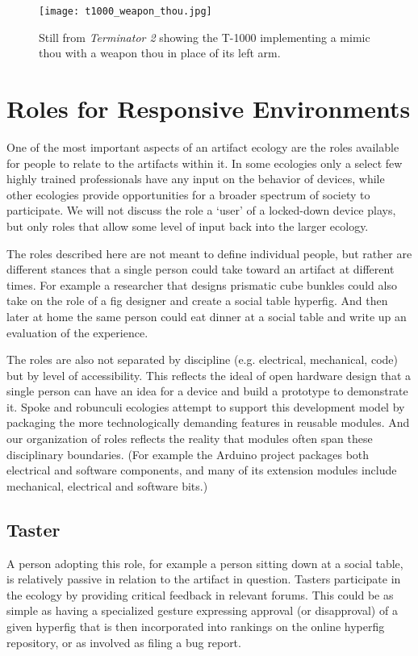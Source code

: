 \begin{figure}[]
  \centering
    \texttt{[image: t1000\_weapon\_thou.jpg]}
  \caption{Still from \emph{Terminator 2} showing the T-1000 implementing a mimic thou with a weapon thou in place of its left arm.}
  \label{fig:t1000_weapon_thou}
\end{figure}



\section{Roles for Responsive Environments}
\label{sec:roles}
%
One of the most important aspects of an artifact ecology are the roles available for people to relate to the artifacts within it. In some ecologies only a select few highly trained professionals have any input on the behavior of devices, while other ecologies provide opportunities for a broader spectrum of society to participate. We will not discuss the role a `user' of a locked-down device plays, but only roles that allow some level of input back into the larger ecology.

The roles described here are not meant to define individual people, but rather are different stances that a single person could take toward an artifact at different times. For example a researcher that designs prismatic cube bunkles could also take on the role of a fig designer and create a social table hyperfig. And then later at home the same person could eat dinner at a social table and write up an evaluation of the experience.

The roles are also not separated by discipline (e.g. electrical, mechanical, code) but by level of accessibility. This reflects the ideal of open hardware design that a single person can have an idea for a device and build a prototype to demonstrate it. Spoke and robunculi ecologies attempt to support this development model by packaging the more technologically demanding features in reusable modules. And our organization of roles reflects the reality that modules often span these disciplinary boundaries. (For example the Arduino project packages both electrical and software components, and many of its extension modules include mechanical, electrical and software bits.)

\subsection{Taster}
A person adopting this role, for example a person sitting down at a social table, is relatively passive in relation to the artifact in question. Tasters participate in the ecology by providing critical feedback in relevant forums. This could be as simple as having a specialized gesture expressing approval (or disapproval) of a given hyperfig that is then incorporated into rankings on the online hyperfig repository, or as involved as filing a bug report.

